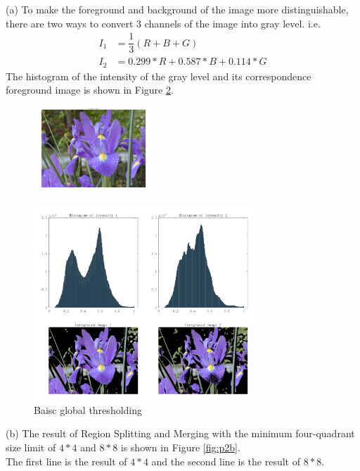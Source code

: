 (a) To make the foreground and background of the image more distinguishable, there are two ways to convert $3$ channels of the image into gray level.
i.e.
\begin{align*}
    I_1 &= \dfrac{1}{3}(R+B+G) \\
    I_2 &= 0.299*R+0.587*B+0.114*G
\end{align*}
The histogram of the intensity of the gray level and its correspondence foreground image is shown in Figure \ref{fig:p2a_result}.\\

\begin{figure}[htbp]
    \centering
    \includegraphics[width=0.4\textwidth]{../images/p2/p2a_origin.png}
    \label{fig:p2a_intensity}
\end{figure}

\begin{figure}[htbp]
\centering
    \includegraphics[width=0.75\textwidth]{../images/p2/p2a_result.png}
    \caption{Baisc global thresholding}
    \label{fig:p2a_result}
\end{figure}

(b) The result of Region Splitting and Merging with the minimum four-quadrant size limit of $4*4$ and $8*8$ is shown in Figure \ref{fig:p2b}.\\
The first line is the result of $4*4$ and the second line is the result of $8*8$.\\


